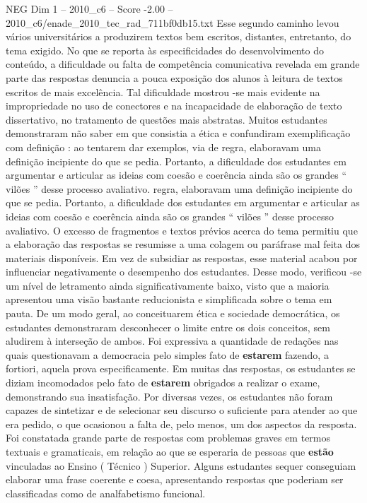 \begin{textsample}{NEG Dim 1 – 2010\_c6 – Score -2.00 – 2010\_c6/enade\_2010\_tec\_rad\_711bf0db15.txt}
Esse segundo caminho levou vários universitários a produzirem textos bem escritos, distantes, entretanto, do tema exigido.
No que se reporta às especificidades do desenvolvimento do conteúdo, a dificuldade ou falta de competência comunicativa revelada em grande parte das respostas denuncia a pouca exposição dos alunos à leitura de textos escritos de mais excelência.
Tal dificuldade mostrou -se mais evidente na impropriedade no uso de conectores e na incapacidade de elaboração de texto dissertativo, no tratamento de questões mais abstratas.
Muitos estudantes demonstraram não saber em que consistia a ética e confundiram exemplificação com definição : ao tentarem dar exemplos, via de regra, elaboravam uma definição incipiente do que se pedia.
Portanto, a dificuldade dos estudantes em argumentar e articular as ideias com coesão e coerência ainda são os grandes “ vilões ” desse processo avaliativo. regra, elaboravam uma definição incipiente do que se pedia.
Portanto, a dificuldade dos estudantes em argumentar e articular as ideias com coesão e coerência ainda são os grandes “ vilões ” desse processo avaliativo.
O excesso de fragmentos e textos prévios acerca do tema permitiu que a elaboração das respostas se resumisse a uma colagem ou paráfrase mal feita dos materiais disponíveis.
Em vez de subsidiar as respostas, esse material acabou por influenciar negativamente o desempenho dos estudantes.
Desse modo, verificou -se um nível de letramento ainda significativamente baixo, visto que a maioria apresentou uma visão bastante reducionista e simplificada sobre o tema em pauta.
De um modo geral, ao conceituarem ética e sociedade democrática, os estudantes demonstraram desconhecer o limite entre os dois conceitos, sem aludirem à interseção de ambos.
Foi expressiva a quantidade de redações nas quais questionavam a democracia pelo simples fato de \textbf{estarem} fazendo, a fortiori, aquela prova especificamente.
Em muitas das respostas, os estudantes se diziam incomodados pelo fato de \textbf{estarem} obrigados a realizar o exame, demonstrando sua insatisfação.
Por diversas vezes, os estudantes não foram capazes de sintetizar e de selecionar seu discurso o suficiente para atender ao que era pedido, o que ocasionou a falta de, pelo menos, um dos aspectos da resposta.
Foi constatada grande parte de respostas com problemas graves em termos textuais e gramaticais, em relação ao que se esperaria de pessoas que \textbf{estão} vinculadas ao Ensino ( Técnico ) Superior.
Alguns estudantes sequer conseguiam elaborar uma frase coerente e coesa, apresentando respostas que poderiam ser classificadas como de analfabetismo funcional.

\end{textsample}
